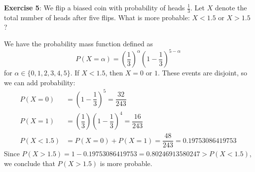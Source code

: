 \documentclass{article}
\begin{document}
\textbf{Exercise 5}: We flip a biased coin with probability of heads $\frac{1}{3}$. Let $X$ denote the total number of heads after five flips. What is more probable: $X < 1.5$ or $X > 1.5$?
    \begin{answer}
        We have the probability mass function defined as 
            \begin{equation*}
                P(X = \alpha) = \left(\dfrac{1}{3}\right)^{\alpha}\left(1 - \dfrac{1}{3}\right)^{5 - \alpha}
            \end{equation*}
        for $\alpha \in \{0, 1, 2, 3, 4, 5\}$. If $X < 1.5$, then $X = 0 \text{ or } 1$. These events are disjoint, so we can add probability:
            \begin{align*}
                P(X = 0)   &= \left(1 - \dfrac{1}{3}\right)^{5} = \dfrac{32}{243}                                           \\
                P(X = 1)   &= \left(\dfrac{1}{3}\right)\left(1 - \dfrac{1}{3}\right)^{4} = \dfrac{16}{243} \\
                P(X < 1.5) &= P(X = 0) + P(X = 1) = \dfrac{48}{243} = 0.19753086419753                                                           
            \end{align*}
        Since $P(X > 1.5) = 1 - 0.19753086419753 = 0.80246913580247 > P(X < 1.5)$, we conclude that $P(X > 1.5)$ is more probable.
    \end{answer}
\end{document}
